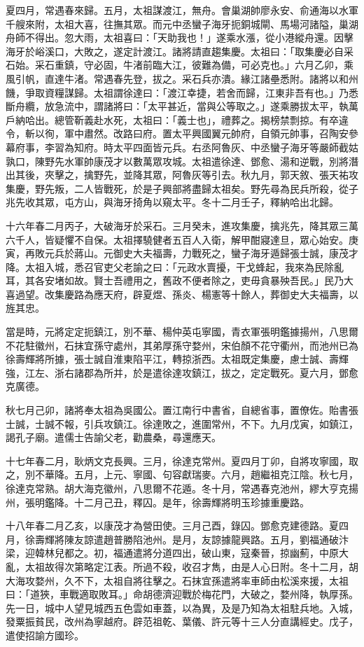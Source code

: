 \begin{pinyinscope}
夏四月，常遇春來歸。五月，太祖謀渡江，無舟。會巢湖帥廖永安、俞通海以水軍千艘來附，太祖大喜，往撫其眾。而元中丞蠻子海牙扼銅城閘、馬場河諸隘，巢湖舟師不得出。忽大雨，太祖喜曰：「天助我也！」遂乘水漲，從小港縱舟還。因擊海牙於峪溪口，大敗之，遂定計渡江。諸將請直趨集慶。太祖曰：「取集慶必自采石始。采石重鎮，守必固，牛渚前臨大江，彼難為備，可必克也。」六月乙卯，乘風引帆，直達牛渚。常遇春先登，拔之。采石兵亦潰。緣江諸壘悉附。諸將以和州饑，爭取資糧謀歸。太祖謂徐達曰：「渡江幸捷，若舍而歸，江東非吾有也。」乃悉斷舟纜，放急流中，謂諸將曰：「太平甚近，當與公等取之。」遂乘勝拔太平，執萬戶納哈出。總管靳義赴水死，太祖曰：「義士也」，禮葬之。揭榜禁剽掠。有卒違令，斬以徇，軍中肅然。改路曰府。置太平興國翼元帥府，自領元帥事，召陶安參幕府事，李習為知府。時太平四面皆元兵。右丞阿魯灰、中丞蠻子海牙等嚴師截姑孰口，陳野先水軍帥康茂才以數萬眾攻城。太祖遣徐達、鄧愈、湯和逆戰，別將潛出其後，夾擊之，擒野先，並降其眾，阿魯灰等引去。秋九月，郭天敘、張天祐攻集慶，野先叛，二人皆戰死，於是子興部將盡歸太祖矣。野先尋為民兵所殺，從子兆先收其眾，屯方山，與海牙掎角以窺太平。冬十二月壬子，釋納哈出北歸。

十六年春二月丙子，大破海牙於采石。三月癸未，進攻集慶，擒兆先，降其眾三萬六千人，皆疑懼不自保。太祖擇驍健者五百人入衛，解甲酣寢達旦，眾心始安。庚寅，再敗元兵於蔣山。元御史大夫福壽，力戰死之，蠻子海牙遁歸張士誠，康茂才降。太祖入城，悉召官吏父老諭之曰：「元政水賣擾，干戈蜂起，我來為民除亂耳，其各安堵如故。賢士吾禮用之，舊政不便者除之，吏毋貪暴殃吾民。」民乃大喜過望。改集慶路為應天府，辟夏煜、孫炎、楊憲等十餘人，葬御史大夫福壽，以旌其忠。

當是時，元將定定扼鎮江，別不華、楊仲英屯寧國，青衣軍張明鑑據揚州，八思爾不花駐徽州，石抹宜孫守處州，其弟厚孫守婺州，宋伯顏不花守衢州，而池州已為徐壽輝將所據，張士誠自淮東陷平江，轉掠浙西。太祖既定集慶，慮士誠、壽輝強，江左、浙右諸郡為所并，於是遣徐達攻鎮江，拔之，定定戰死。夏六月，鄧愈克廣德。

秋七月己卯，諸將奉太祖為吳國公。置江南行中書省，自總省事，置僚佐。貽書張士誠，士誠不報，引兵攻鎮江。徐達敗之，進圍常州，不下。九月戊寅，如鎮江，謁孔子廟。遣儒士告諭父老，勸農桑，尋還應天。

十七年春二月，耿炳文克長興。三月，徐達克常州。夏四月丁卯，自將攻寧國，取之，別不華降。五月，上元、寧國、句容獻瑞麥。六月，趙繼祖克江陰。秋七月，徐達克常熟。胡大海克徽州，八思爾不花遁。冬十月，常遇春克池州，繆大亨克揚州，張明鑑降。十二月己丑，釋囚。是年，徐壽輝將明玉珍據重慶路。

十八年春二月乙亥，以康茂才為營田使。三月己酉，錄囚。鄧愈克建德路。夏四月，徐壽輝將陳友諒遣趙普勝陷池州。是月，友諒據龍興路。五月，劉福通破汴梁，迎韓林兒都之。初，福通遣將分道四出，破山東，寇秦晉，掠幽薊，中原大亂，太祖故得次第略定江表。所過不殺，收召才雋，由是人心日附。冬十二月，胡大海攻婺州，久不下，太祖自將往擊之。石抹宜孫遣將率車師由松溪來援，太祖曰：「道狹，車戰適取敗耳。」命胡德濟迎戰於梅花門，大破之，婺州降，執厚孫。先一日，城中人望見城西五色雲如車蓋，以為異，及是乃知為太祖駐兵地。入城，發粟振貧民，改州為寧越府。辟范祖乾、葉儀、許元等十三人分直講經史。戊子，遣使招諭方國珍。


\end{pinyinscope}
